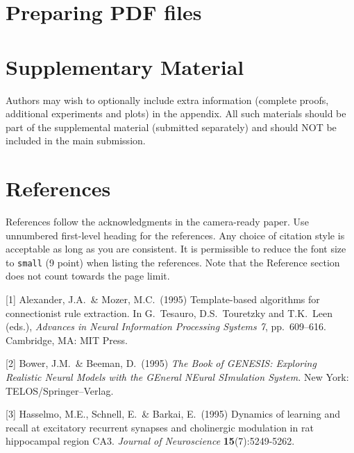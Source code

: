 \documentclass{article}
\begin{document}
\section{Preparing PDF files}


\section{Supplementary Material}

Authors may wish to optionally include extra information (complete proofs, additional experiments and plots) in the appendix. All such materials should be part of the supplemental material (submitted separately) and should NOT be included in the main submission.


\section*{References}


References follow the acknowledgments in the camera-ready paper. Use unnumbered first-level heading for
the references. Any choice of citation style is acceptable as long as you are
consistent. It is permissible to reduce the font size to \verb+small+ (9 point)
when listing the references.
Note that the Reference section does not count towards the page limit.
\medskip


{
\small


[1] Alexander, J.A.\ \& Mozer, M.C.\ (1995) Template-based algorithms for
connectionist rule extraction. In G.\ Tesauro, D.S.\ Touretzky and T.K.\ Leen
(eds.), {\it Advances in Neural Information Processing Systems 7},
pp.\ 609--616. Cambridge, MA: MIT Press.


  [2] Bower, J.M.\ \& Beeman, D.\ (1995) {\it The Book of GENESIS: Exploring
    Realistic Neural Models with the GEneral NEural SImulation System.}  New York:
TELOS/Springer--Verlag.


[3] Hasselmo, M.E., Schnell, E.\ \& Barkai, E.\ (1995) Dynamics of learning and
recall at excitatory recurrent synapses and cholinergic modulation in rat
hippocampal region CA3. {\it Journal of Neuroscience} {\bf 15}(7):5249-5262.
}

\end{document}
